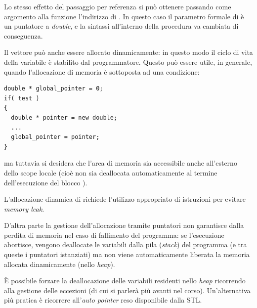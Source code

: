\lstset{basicstyle=\scriptsize\sf}

\lstset{basicstyle=\sf}

Lo stesso effetto del passaggio per referenza si pu\`o ottenere
passando come argomento alla funzione l'indirizzo di . In
questo caso il parametro formale di  \`e un puntatore
a \emph{double}, e la sintassi all'interno della procedura va cambiata
di conseguenza.

\lstset{basicstyle=\scriptsize\sf}

\lstset{basicstyle=\sf}

Il vettore  pu\`o anche essere allocato dinamicamente: in
questo modo il ciclo di vita della variabile \`e stabilito dal
programmatore. Questo pu\`o essere utile, in generale, quando
l'allocazione di memoria \`e sottoposta ad una condizione:

\lstset{basicstyle=\scriptsize\sf}
\begin{lstlisting}
double * global_pointer = 0;
if( test )
{
  double * pointer = new double;
  ...
  global_pointer = pointer;
}
\end{lstlisting}
\lstset{basicstyle=\sf}

ma tuttavia si desidera che l'area di memoria sia accessibile anche
all'esterno dello scope locale (cio\`e non sia deallocata
automaticamente al termine dell'esecuzione del blocco ).

L'allocazione dinamica di  richiede l'utilizzo appropriato
di istruzioni  per evitare \emph{memory leak}.

\lstset{basicstyle=\scriptsize\sf}

\lstset{basicstyle=\sf}

D'altra parte la gestione dell'allocazione tramite
puntatori non garantisce dalla perdita di memoria nel caso di
fallimento del programma: se l'esecuzione abortisce, vengono
deallocate le variabili dalla pila (\emph{stack}) del programma (e tra queste i puntatori
istanziati) ma non viene automaticamente liberata la
memoria allocata dinamicamente (nello \emph{heap}).

\`E possibile forzare la deallocazione delle variabili residenti nello
\emph{heap} ricorrendo alla gestione delle eccezioni (di cui si
parler\`a pi\`u avanti nel corso). Un'alternativa pi\`u pratica \`e
ricorrere all'\emph{auto pointer} reso disponibile dalla STL.

